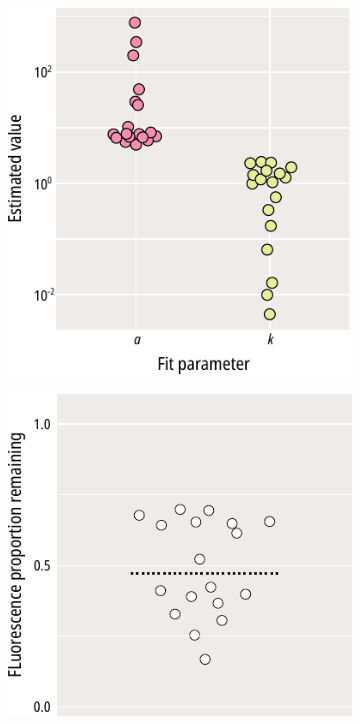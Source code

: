 \begin{figure}[hbtp]
\begin{subfigure}[t]{0.45\textwidth}
		\includegraphics[width=\textwidth]{bleaching_terms_3.pdf}
	\end{subfigure}
	\hfill
	\begin{subfigure}[t]{0.45\textwidth}
		\caption{}\label{ch3fig:bleaching_terms_4}
		\centering
		\includegraphics[width=\textwidth]{bleaching_terms_4.pdf}

\end{subfigure}
\end{figure}
